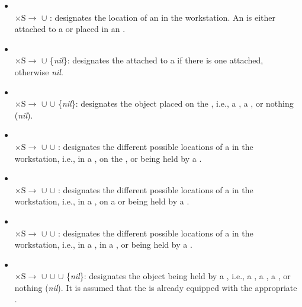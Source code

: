 \begin{itemize}
\item {}\\ $\mathrm{\times S\rightarrow}$ $\cup$ : designates the location of an  in the workstation. An  is either attached to a  or placed in an .

\item {}\\ $\mathrm{\times S\rightarrow}$ $\cup$ \{\textit{nil}\}: designates the  attached to a  if there is one attached, otherwise \textit{nil}.

\item {}\\ $\mathrm{\times S\rightarrow}$ $\cup$  $\cup$ \{\textit{nil}\}: designates the object placed on the , i.e., a , a , or nothing (\textit{nil}).

\item {}\\ $\mathrm{\times S\rightarrow}$ $\cup$  $\cup$ : designates the different possible locations of a  in the workstation, i.e., in a , on the , or being held by a .

\item {}\\ $\mathrm{\times S\rightarrow}$ $\cup$  $\cup$ : designates the different possible locations of a  in the workstation, i.e., in a , on a  or being held by a .

\item {}\\ $\mathrm{\times S\rightarrow}$ $\cup$  $\cup$ : designates the different possible locations of a  in the workstation, i.e., in a , in a , or being held by a .

\item {}\\ $\mathrm{\times S\rightarrow}$ $\cup$  $\cup$  $\cup$ \{\textit{nil}\}: designates the object being held by a , i.e., a , a , a , or nothing (\textit{nil}). It is assumed that the  is already equipped with the appropriate .


\end{itemize}
